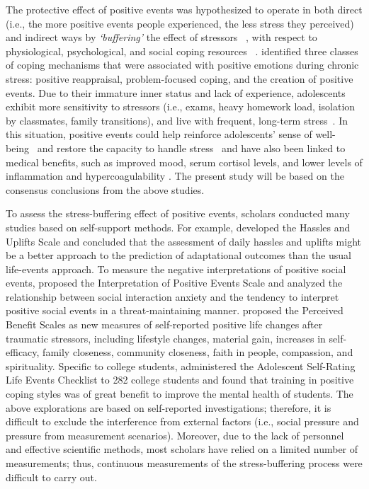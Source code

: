 \documentclass[5p,times,numbers,authoryear]{elsarticle}
\begin{document}
The protective effect of positive events was hypothesized to operate in both direct (i.e., the more positive events people experienced, the less stress they perceived)
and indirect ways by \emph{`buffering'} the effect of stressors ~\citep{Cohen2010Positive,Shahar2002Positive},
with respect to physiological, psychological, and social coping resources ~\citep{Cohen1984Positive, Needles1990Positive}.
\citep{Folkman2010Stress} identified three classes of coping mechanisms that were associated with positive emotions during chronic stress: positive reappraisal, problem-focused coping, and the creation of positive events.
Due to their immature inner status and lack of experience,
adolescents exhibit more sensitivity to stressors
(i.e., exams, heavy homework load, isolation by classmates, family transitions),
and live with frequent, long-term stress~\citep{older}.
In this situation, positive events could help reinforce adolescents' sense of well-being~\citep{Coolidge2009A} and
restore the capacity to handle stress~\citep{Doyle2003Positive}
and have also been linked to medical benefits, such as improved mood, serum cortisol levels, and lower levels of inflammation and hypercoagulability \citep{Jain2010Effects,Caputo1998Influence}.
The present study will be based on the consensus conclusions from the above studies.

To assess the stress-buffering effect of positive events,
scholars conducted many studies based on self-support methods.
For example,
\citep{Kanner1981Comparison} developed the Hassles and Uplifts Scale
and concluded that the assessment of daily hassles and uplifts might be a better approach to the prediction of adaptational outcomes than the usual life-events approach.
To measure the negative interpretations of positive social events,
\citep{Alden2008Social} proposed the Interpretation of Positive Events Scale and analyzed 
{the relationship between social interaction anxiety and the tendency to interpret positive social events in a threat-maintaining manner.}
\citep{Mcmillen1998The} proposed the Perceived Benefit Scales as new measures of self-reported positive life changes after traumatic stressors, including lifestyle changes, material gain, increases in self-efficacy, family closeness, community closeness, faith in people, compassion, and spirituality.
Specific to college students,
\citep{Jun2008Influence} administered the Adolescent Self-Rating Life Events Checklist  to 282 college students  and found that training in positive coping styles was of great benefit to improve the mental health of students.
The above explorations are based on self-reported investigations; therefore, it is difficult to exclude the interference from external factors (i.e., social pressure and pressure from measurement scenarios).
Moreover, due to the lack of personnel and effective scientific methods,
most scholars have relied on a limited number of measurements;
thus, continuous measurements of the stress-buffering process were difficult to carry out.
\end{document}
